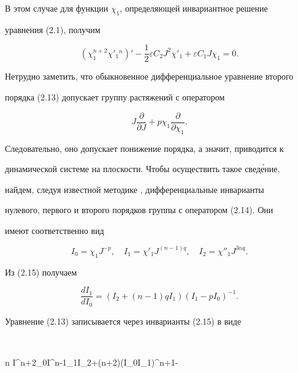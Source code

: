 В этом случае для функции $\chi_1$, определяющей инвариантное решение 


уравнения (2.1), получим 


\begin{equation} 


(\chi^{n+2}_1\chi'_1{}^n)'-\frac{1}{2}\varepsilon 


C_2J^2\chi'_1+\varepsilon C_1J\chi_1=0. \tag{2.13} 


\end{equation} 


Нетрудно заметить, что обыкновенное дифференциальное уравнение второго 


порядка (2.13) допускает группу растяжений с оператором 


\begin{equation} 


J\frac{\partial}{\partial J}+p\chi_1\frac{\partial}{\partial\chi_1}. 


\tag{2.14} 


\end{equation} 


Следовательно, оно допускает понижение порядка, а значит, приводится к 


динамической системе на плоскости. Чтобы осуществить такое свед\'ение, 


найдем, следуя известной методике \cite{5}, дифференциальные инварианты 


нулевого, первого и второго порядков группы с оператором (2.14). Они 


имеют соответственно вид 


\begin{equation} 


I_0=\chi_1J^{-p},\quad I_1=\chi'_1J^{(n-1)q},\quad 


I_2=\chi''_1J^{3nq}.\tag{2.15} 


\end{equation} 


Из (2.15) получаем 


\begin{equation} 


\frac{dI_1}{dI_0}=(I_2+(n-1)q I_1)(I_1-p I_0)^{-1}.\tag{2.16} 


\end{equation} 


Уравнение (2.13) записывается через инварианты (2.15) в виде 


$$ 


n I^{n+2}_0I^{n-1}_1I_2+(n+2)(I_0I_1)^{n+1}- 


